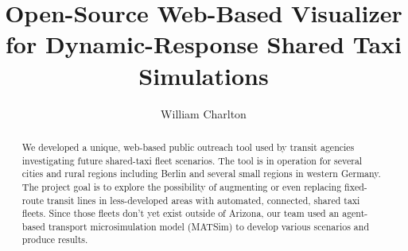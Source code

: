 \documentclass[3p,times,procedia]{elsarticle}
\begin{document}
\begin{frontmatter}



%

\title{Open-Source Web-Based Visualizer for Dynamic-Response Shared Taxi Simulations}


\author[a]{William Charlton}

\address[a]{Technische Universität Berlin, Chair of Transport Systems Planning and Transport Telematics, Straße des 17. Juni 135, 10623 Berlin, Germany}

\begin{abstract}
We developed a unique, web-based public outreach tool used by transit agencies investigating future shared-taxi fleet scenarios. The tool is in operation for several cities and rural regions including Berlin and several small regions in western Germany. The project goal is to explore the possibility of augmenting or even replacing fixed-route transit lines in less-developed areas with automated, connected, shared taxi fleets. Since those fleets don’t yet exist outside of Arizona, our team used an agent-based transport microsimulation model (MATSim) to develop various scenarios and produce results.
\end{abstract}


\end{frontmatter}
\end{document}
